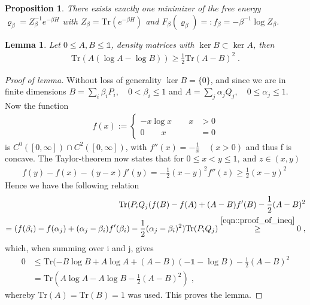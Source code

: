 \documentclass[
a4paper, %
11pt, %
onecolumn, %
openany, %
]{memoir}
\theoremstyle{definition}
\theoremstyle{remark}
\theoremstyle{plain}
\newtheorem{prop}[definition]{Proposition}
\newtheorem{lemma}[definition]{Lemma}
\begin{document}
\begin{prop}
	There exists exactly one minimizer of the free energy $\varrho_{\beta}=Z_{\beta}^{-1}e^{-\beta H}$ with $Z_{\beta}=\mathrm{Tr}(e^{-\beta H})$ and $F_{\beta}(\varrho_{\beta})=:f_{\beta}=-\beta^{-1}\log Z_{\beta}$.
\end{prop}
\begin{lemma}
	Let $0\leq A,B\leq \mathds{1}$, density matrices with $\ker B\subset \ker A$, then \begin{align}
	\mathrm{Tr}(A(\log A-\log B))\geq \frac{1}{2}\mathrm{Tr}(A-B)^2\; .
	\end{align}
\end{lemma}
\begin{proof}[Proof of lemma]
	Without loss of generality $\ker B=\{0\}$, and since we are in finite dimensions $B=\sum_i\beta_iP_i,\quad 0<\beta_i\leq 1$ and $A=\sum_j \alpha_jQ_j, \quad 0\leq \alpha_j\leq 1$. Now the function \begin{align}
	f(x):=\begin{cases}
	-x\log x\qquad  x&>0\\0 \qquad x&=0
	\end{cases}
	\end{align}
	is $C^0([0,\infty])\cap C^2([0,\infty])$, with $f''(x)=-\frac{1}{x}\quad (x>0)$ and thus f is concave. The Taylor-theorem now states that for $0\leq x<y\leq 1,~ \text{and }z\in (x,y)$
	\begin{align}
	f(y)-f(x)-(y-x)f'(y)=-\frac{1}{2}(x-y)^2f''(z)\geq \frac{1}{2}(x-y)^2\;\label{eqn::proof_of_ineq}
	\end{align}
	Hence we have the following relation \begin{align}
	\mathrm{Tr}(P_iQ_j(f(B)-f(A)+(A-B)f'(B)-\frac{1}{2}(A-B)^2\\=(f(\beta_i)-f(\alpha_j)+(\alpha_j-\beta_i)f'(\beta_i)-\frac{1}{2}(\alpha_j-\beta_i)^2)\mathrm{Tr}(P_iQ_j)\overset{\eqref{eqn::proof_of_ineq}}{\geq }0\; ,
	\end{align}
	which, when summing over i and j, gives \begin{align}
	0&\leq \mathrm{Tr}(-B\log B+A\log A +(A-B)(-\mathds{1}-\log B)-\frac{1}{2}(A-B)^2\\
	&=\mathrm{Tr}(A\log A-A\log B-\frac{1}{2}(A-B)^2)\;,
	\end{align}
	whereby $\mathrm{Tr}(A)=\mathrm{Tr}(B)=1$ was used. This proves the lemma.
\end{proof}
\end{document}
